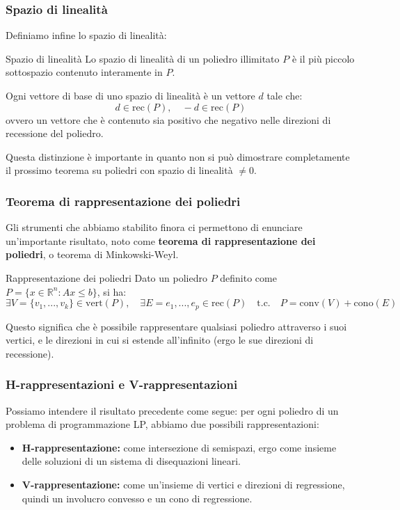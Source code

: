\documentclass[a4paper,11pt]{article}
\begin{document}
\subsubsection{Spazio di linealità}

Definiamo infine lo spazio di linealità:
\begin{definition}{Spazio di linealità}
	Lo spazio di linealità di un poliedro illimitato $P$ è il più piccolo sottospazio contenuto interamente in $P$.
\end{definition}
Ogni vettore di base di uno spazio di linealità è un vettore $d$ tale che:
$$
d \in \mathrm{rec}(P), \quad - d \in \mathrm{rec}(P)
$$
ovvero un vettore che è contenuto sia positivo che negativo nelle direzioni di recessione del poliedro.

Questa distinzione è importante in quanto non si può dimostrare completamente il prossimo teorema su poliedri con spazio di linealità $\neq {0}$.

\subsubsection{Teorema di rappresentazione dei poliedri}
Gli strumenti che abbiamo stabilito finora ci permettono di enunciare un'importante risultato, noto come \textbf{teorema di rappresentazione dei poliedri}, o teorema di Minkowski-Weyl.

\begin{theorem}{Rappresentazione dei poliedri}
	Dato un poliedro $P$ definito come $P = \{ x \in \mathbb{R}^n : Ax \leq b \}$, si ha:
	$$
	\exists V = \{ v_1, ..., v_k \} \in \mathrm{vert}(P), \quad \exists E = {e_1, ..., e_p} \in \mathrm{rec}(P) \quad \text{t.c.} \quad P = \mathrm{conv}(V) + \mathrm{cono}(E)
	$$
\end{theorem}

Questo significa che è possibile rappresentare qualsiasi poliedro attraverso i suoi vertici, e le direzioni in cui si estende all'infinito (ergo le sue direzioni di recessione).

\subsubsection{H-rappresentazioni e V-rappresentazioni}
Possiamo intendere il risultato precedente come segue: per ogni poliedro di un problema di programmazione LP, abbiamo due possibili rappresentazioni:
\begin{itemize}
	\item \textbf{H-rappresentazione:} come intersezione di semispazi, ergo come insieme delle soluzioni di un sistema di disequazioni lineari.
	\item \textbf{V-rappresentazione:} come un'insieme di vertici e direzioni di regressione, quindi un involucro convesso e un cono di regressione.
\end{itemize}
\end{document}
